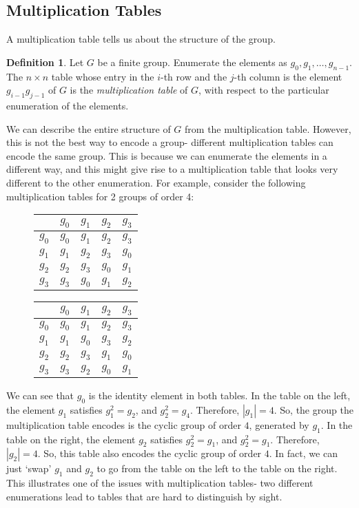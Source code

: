 \documentclass[a4paper, openany]{memoir}
\theoremstyle{definition}
\newtheorem{definition}{Definition}[section]
\theoremstyle{plain}
\begin{document}
\subsection{Multiplication Tables}
A multiplication table tells us about the structure of the group.
\begin{definition}
Let $G$ be a finite group. Enumerate the elements as $g_0, g_1, \dots, g_{n-1}$. The $n \times n$ table whose entry in the $i$-th row and the $j$-th column is the element $g_{i-1} g_{j-1}$ of $G$ is the \emph{multiplication table} of $G$, with respect to the particular enumeration of the elements.
\end{definition}
\noindent We can describe the entire structure of $G$ from the multiplication table. However, this is not the best way to encode a group- different multiplication tables can encode the same group. This is because we can enumerate the elements in a different way, and this might give rise to a multiplication table that looks very different to the other enumeration. For example, consider the following multiplication tables for 2 groups of order 4:
\begin{figure}[H]
    \centering
    \begin{tabular}{c|cccc}
         & $g_0$ & $g_1$ & $g_2$ & $g_3$ \\
        \hline
        $g_0$ & $g_0$ & $g_1$ & $g_2$ & $g_3$ \\
        $g_1$ & $g_1$ & $g_2$ & $g_3$ & $g_0$ \\
        $g_2$ & $g_2$ & $g_3$ & $g_0$ & $g_1$ \\
        $g_3$ & $g_3$ & $g_0$ & $g_1$ & $g_2$
    \end{tabular}
    \hspace{20pt}
    \begin{tabular}{c|cccc}
         & $g_0$ & $g_1$ & $g_2$ & $g_3$ \\
        \hline
        $g_0$ & $g_0$ & $g_1$ & $g_2$ & $g_3$ \\
        $g_1$ & $g_1$ & $g_0$ & $g_3$ & $g_2$ \\
        $g_2$ & $g_2$ & $g_3$ & $g_1$ & $g_0$ \\
        $g_3$ & $g_3$ & $g_2$ & $g_0$ & $g_1$
    \end{tabular}
\end{figure}
We can see that $g_0$ is the identity element in both tables. In the table on the left, the element $g_1$ satisfies $g_1^2 = g_2$, and $g_2^2 = g_4$. Therefore, $|g_1| = 4$. So, the group the multiplication table encodes is the cyclic group of order $4$, generated by $g_1$. In the table on the right, the element $g_2$ satisfies $g_2^2 = g_1$, and $g_2^2 = g_1$. Therefore, $|g_2| = 4$. So, this table also encodes the cyclic group of order $4$. In fact, we can just `swap' $g_1$ and $g_2$ to go from the table on the left to the table on the right. This illustrates one of the issues with multiplication tables- two different enumerations lead to tables that are hard to distinguish by sight.
\end{document}
